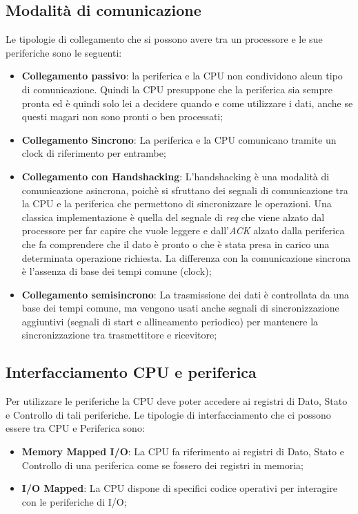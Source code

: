 \subsection{Modalità di comunicazione}
Le tipologie di collegamento che si possono avere tra un processore e le sue periferiche sono le seguenti:
\begin{itemize}
    \item \textbf{Collegamento passivo}: la periferica e la CPU non condividono alcun tipo di comunicazione. Quindi la CPU presuppone che la periferica sia sempre pronta ed è quindi solo lei a decidere quando e come utilizzare i dati, anche se questi magari non sono pronti o ben processati;
    \item \textbf{Collegamento Sincrono}: La periferica e la CPU comunicano tramite un clock di riferimento per entrambe;
    \item \textbf{Collegamento con Handshacking}: L'handshacking è una modalità di comunicazione asincrona, poichè si sfruttano dei segnali di comunicazione tra la CPU e la periferica che permettono di sincronizzare le operazioni. Una classica implementazione è quella del segnale di \textit{req} che viene alzato dal processore per far capire che vuole leggere e dall'\textit{ACK} alzato dalla periferica che fa comprendere che il dato è pronto o che è stata presa in carico una determinata operazione richiesta. La differenza con la comunicazione sincrona è l'assenza di base dei tempi comune (clock);
    \item \textbf{Collegamento semisincrono}: La trasmissione dei dati è controllata da una base dei tempi comune, ma vengono usati anche segnali di sincronizzazione aggiuntivi (segnali di start e allineamento periodico) per mantenere la sincronizzazione tra trasmettitore e ricevitore;
\end{itemize}

\subsection{Interfacciamento CPU e periferica}
Per utilizzare le periferiche la CPU deve poter accedere ai registri di Dato, Stato e Controllo di tali periferiche. Le tipologie di interfacciamento che ci possono essere tra CPU e Periferica sono:
\begin{itemize}
    \item \textbf{Memory Mapped I/O}: La CPU fa riferimento ai registri di Dato, Stato e Controllo di una periferica come se fossero dei registri in memoria;
    \item \textbf{I/O Mapped}: La CPU dispone di specifici codice operativi per interagire con le periferiche di I/O;
\end{itemize}

